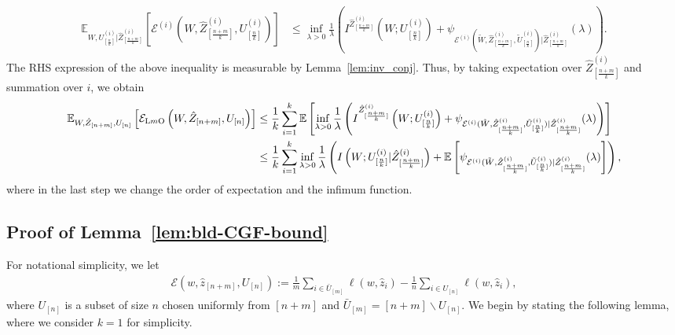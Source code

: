 \documentclass[onecolumn,romanappendices,10pt]{IEEEtran}
\newcommand{\Ecal}{{\mathcal E}}
\newcommand{\EE}{{\mathbb{E}}}
\begin{document}
	\begin{equation}
		\begin{aligned}
			\EE_{W, U^{(i)}_{[\frac{n}{k}]} | \hat{Z}^{(i)}_{[\frac{n+m}{k}]}} \left[ \Ecal^{(i)} \left( W, \hat{Z}^{(i)}_{[\frac{n+m}{k}]}, U^{(i)}_{[\frac{n}{k}]} \right) \right] &\leq \inf_{\lambda > 0} \frac{1}{\lambda} \left( I^{\hat{Z}^{(i)}_{[\frac{n+m}{k}]}}\left( W; U^{(i)}_{[\frac{n}{k}]} \right) + \psi_{\mathcal{E}^{(i)}(\tilde{W}, \hat{Z}^{(i)}_{[\frac{n+m}{k}]}, \tilde{U}^{(i)}_{[\frac{n}{k}]}) | \hat{Z}^{(i)}_{[\frac{n+m}{k}]}}(\lambda) \right).
		\end{aligned}
	\end{equation}
	The RHS expression of the above inequality is measurable by Lemma~\ref{lem:inv_conj}. Thus, by taking expectation over $\hat{Z}^{(i)}_{[\frac{n+m}{k}]}$ and summation over $i$, we obtain
	\begin{equation}
		\begin{aligned}
			\EE_{W, \hat{Z}_{[n+m]}, U_{[n]}} \left[ \Ecal_{\textnormal{L$m$O}} \left( W, \hat{Z}_{[n+m]}, U_{[n]} \right) \right] &\leq \frac{1}{k} \sum_{i=1}^{k} \EE \left[ \inf_{\lambda > 0} \frac{1}{\lambda} \left( I^{\hat{Z}^{(i)}_{[\frac{n+m}{k}]}}\left( W; U^{(i)}_{[\frac{n}{k}]} \right) + \psi_{\mathcal{E}^{(i)}(\tilde{W}, \hat{Z}^{(i)}_{[\frac{n+m}{k}]}, \tilde{U}^{(i)}_{[\frac{n}{k}]}) | \hat{Z}^{(i)}_{[\frac{n+m}{k}]}}(\lambda) \right) \right] \\
			&\leq \frac{1}{k} \sum_{i=1}^{k} \inf_{\lambda > 0} \frac{1}{\lambda} \left(I\left( W; U^{(i)}_{[\frac{n}{k}]} | \hat{Z}^{(i)}_{[\frac{n+m}{k}]} \right) + \EE \left[ \psi_{\mathcal{E}^{(i)}(\tilde{W}, \hat{Z}^{(i)}_{[\frac{n+m}{k}]}, \tilde{U}^{(i)}_{[\frac{n}{k}]}) | \hat{Z}^{(i)}_{[\frac{n+m}{k}]}}(\lambda) \right] \right),
		\end{aligned}
	\end{equation}
	where in the last step we change the order of expectation and the infimum function.
	
	\subsection{Proof of Lemma~\ref{lem:bld-CGF-bound}} \label{appsub:lemma2}
	For notational simplicity, we let
	\begin{align}
		\Ecal\left( w, \hat{z}_{[n+m]}, U_{[n]} \right) := \frac{1}{m} \sum_{i \in \bar{U}_{[m]}} \ell(w, \hat{z}_i) - \frac{1}{n} \sum_{i \in U_{[n]}} \ell(w, \hat{z}_i), \label{eq:def-cv-err}
	\end{align}
	where $U_{[n]}$ is a subset of size $n$ chosen uniformly from $[n+m]$ and $\bar{U}_{[m]} = [n+m] \backslash U_{[n]}$. We begin by stating the following lemma, where we consider $k=1$ for simplicity. 
	
\end{document}
